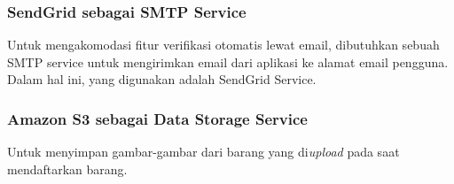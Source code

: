     \subsubsection{\textbf{SendGrid} sebagai SMTP Service}
    Untuk mengakomodasi fitur verifikasi otomatis lewat email, dibutuhkan sebuah SMTP service untuk mengirimkan email dari aplikasi ke alamat email pengguna. Dalam hal ini, yang digunakan adalah SendGrid Service.
    
    \subsubsection{\textbf{Amazon S3} sebagai Data Storage Service}
    Untuk menyimpan gambar-gambar dari barang yang di\textit{upload} pada saat mendaftarkan barang.

      
   \pagebreak
   
      
    